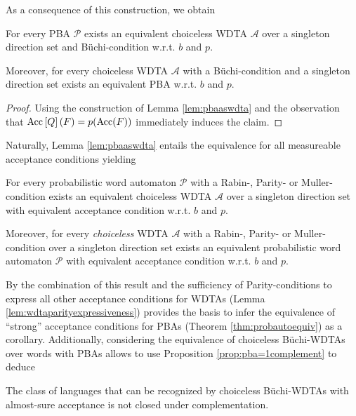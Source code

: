 As a consequence of this construction, we obtain
\begin{theorem}
  For every \ac{PBA} $\mathcal{P}$ exists an equivalent choiceless \ac{WDTA}
  $\mathcal{A}$ over a singleton direction set and Büchi-condition w.r.t. $b$
  and $p$.

  Moreover, for every choiceless \ac{WDTA} $\mathcal{A}$ with a Büchi-condition
  and a singleton direction set exists an equivalent \ac{PBA} w.r.t. $b$ and
  $p$.
  \label{thm:pbaaswdta}
\end{theorem}
\begin{proof}
  Using the construction of Lemma \ref{lem:pbaaswdta} and the observation that
  $\operatorname{Acc}\left[Q\right](F) = p(\operatorname{Acc}(F))$ immediately induces the claim.
\end{proof}

Naturally, Lemma \ref{lem:pbaaswdta} entails the equivalence for all
measureable acceptance conditions yielding
\begin{corollary}
  For every probabilistic word automaton $\mathcal{P}$ with a Rabin-, Parity- 
  or Muller-condition exists an equivalent choiceless \ac{WDTA} $\mathcal{A}$ 
  over a singleton direction set with equivalent acceptance condition w.r.t.
  $b$ and $p$.
  
  Moreover, for every \emph{choiceless} \ac{WDTA} $\mathcal{A}$ with a Rabin-,
  Parity- or Muller-condition over a singleton direction set exists an
  equivalent probabilistic word automaton $\mathcal{P}$ with equivalent
  acceptance condition w.r.t. $b$ and $p$.
\end{corollary}
By the combination of this result and the sufficiency of Parity-conditions to
express all other acceptance conditions for \acp{WDTA} (Lemma 
\ref{lem:wdtaparityexpressiveness}) provides the basis to infer the equivalence 
of \enquote{strong} acceptance conditions for \acp{PBA} (Theorem 
\ref{thm:probautoequiv}) as a corollary. Additionally, considering the 
equivalence of choiceless Büchi-\acp{WDTA} over words with \acp{PBA} allows to
use Proposition \ref{prop:pba=1complement} to deduce
\begin{proposition}
  The class of languages that can be recognized by choiceless Büchi-\acp{WDTA}
  with almost-sure acceptance is not closed under complementation.
\end{proposition}

